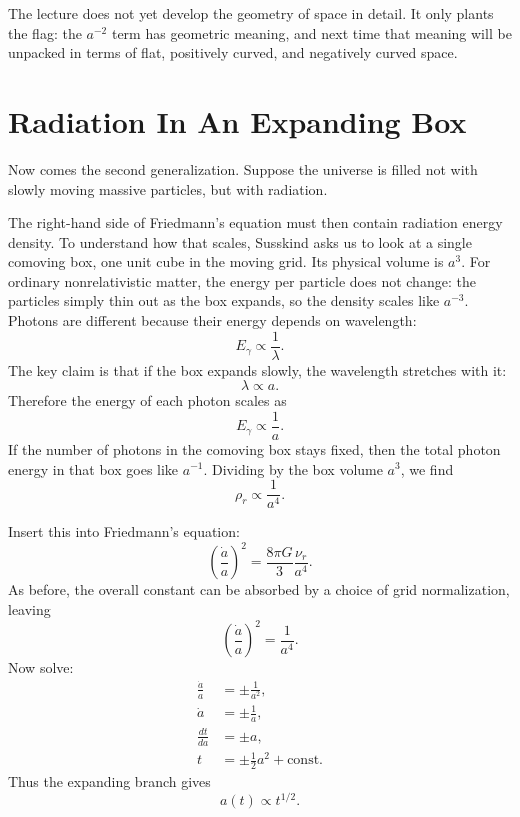 The lecture does not yet develop the geometry of space in detail. It only plants the flag: the \(a^{-2}\) term has geometric meaning, and next time that meaning will be unpacked in terms of flat, positively curved, and negatively curved space.

\section{Radiation In An Expanding Box}

Now comes the second generalization. Suppose the universe is filled not with slowly moving massive particles, but with radiation.

The right-hand side of Friedmann's equation must then contain radiation energy density. To understand how that scales, Susskind asks us to look at a single comoving box, one unit cube in the moving grid. Its physical volume is \(a^3\). For ordinary nonrelativistic matter, the energy per particle does not change: the particles simply thin out as the box expands, so the density scales like \(a^{-3}\). Photons are different because their energy depends on wavelength:
\begin{equation}
E_\gamma \propto \frac{1}{\lambda}.
\end{equation}
The key claim is that if the box expands slowly, the wavelength stretches with it:
\begin{equation}
\lambda \propto a.
\end{equation}
Therefore the energy of each photon scales as
\begin{equation}
E_\gamma \propto \frac{1}{a}.
\end{equation}
If the number of photons in the comoving box stays fixed, then the total photon energy in that box goes like \(a^{-1}\). Dividing by the box volume \(a^3\), we find
\begin{equation}
\rho_r \propto \frac{1}{a^4}.
\end{equation}

Insert this into Friedmann's equation:
\begin{equation}
\left(\frac{\dot a}{a}\right)^2
=
\frac{8\pi G}{3}\frac{\nu_r}{a^4}.
\end{equation}
As before, the overall constant can be absorbed by a choice of grid normalization, leaving
\begin{equation}
\left(\frac{\dot a}{a}\right)^2=\frac{1}{a^4}.
\end{equation}
Now solve:
\begin{align}
\frac{\dot a}{a} &= \pm \frac{1}{a^2},\\
\dot a &= \pm \frac{1}{a},\\
\frac{dt}{da} &= \pm a,\\
t &= \pm \frac{1}{2}a^2+\text{const}.
\end{align}
Thus the expanding branch gives
\begin{equation}
a(t)\propto t^{1/2}.
\end{equation}

